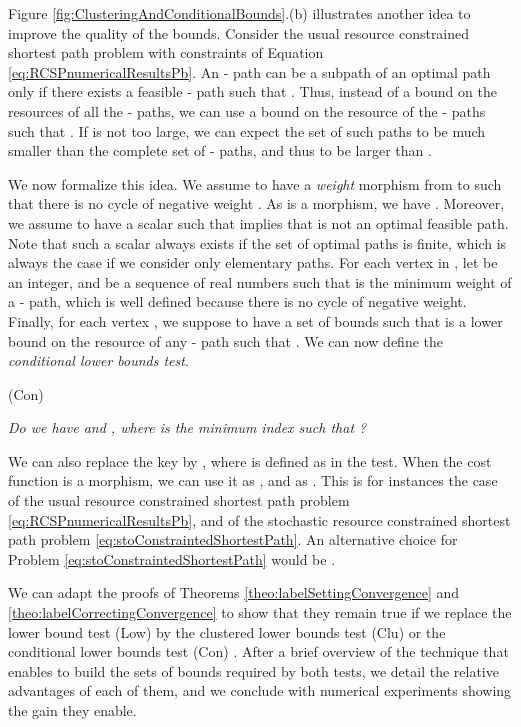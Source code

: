 \documentclass[11pt]{amsart}
\theoremstyle{plain}
\theoremstyle{remark}
\begin{document}
Figure \ref{fig:ClusteringAndConditionalBounds}.(b) illustrates another idea to improve the quality of the bounds. Consider the usual resource constrained shortest path problem with  constraints of Equation \eqref{eq:RCSPnumericalResultsPb}. An - path  can be a subpath of an optimal path only if there exists a feasible - path  such that . Thus, instead of a bound  on the resources of all the - paths, we can use a bound  on the resource of the - paths  such that . If  is not too large, we can expect the set of such paths  to be much smaller than the complete set of - paths, and thus  to be larger than . 

We now formalize this idea. We assume to have a \emph{weight} morphism  from  to  such that there is no cycle  of negative weight . As  is a morphism, we have . Moreover, we assume to have a scalar  such that  implies that  is not an optimal feasible path. Note that such a scalar always exists if the set of optimal paths is finite, which is always the case if we consider only elementary paths. For each vertex  in , let  be an integer, and  be a sequence of real numbers such that  is the minimum weight of a - path, which is well defined because there is no cycle of negative weight. Finally, for each vertex , we suppose to have a set of bounds  such that  is a lower bound on the resource of any - path  such that . We can now define the \emph{conditional lower bounds test}.

\smallskip 
	(Con) \begin{minipage}{\dimexpr\textwidth-2cm} \emph{Do we have  and , where  is the minimum index such that ?}
	\end{minipage}
\smallskip

\noindent We can also replace the key  by , where  is defined as in the test. When the cost function  is a morphism, we can use it as , and  as . This is for instances the case of the usual resource constrained shortest path problem \eqref{eq:RCSPnumericalResultsPb}, and of the stochastic resource constrained shortest path problem \eqref{eq:stoConstraintedShortestPath}. An alternative choice for Problem \eqref{eq:stoConstraintedShortestPath}  would be .

We can adapt the proofs of Theorems \ref{theo:labelSettingConvergence} and \ref{theo:labelCorrectingConvergence} to show that they remain true if we replace the lower bound test (Low) by the clustered lower bounds test (Clu) or the conditional lower bounds test (Con) \cite{parmentier2016thesis}.  After a brief overview of the technique that enables to build the sets of bounds required by both tests, we detail the relative advantages of each of them, and we conclude with numerical experiments showing the gain they enable.
\end{document}
